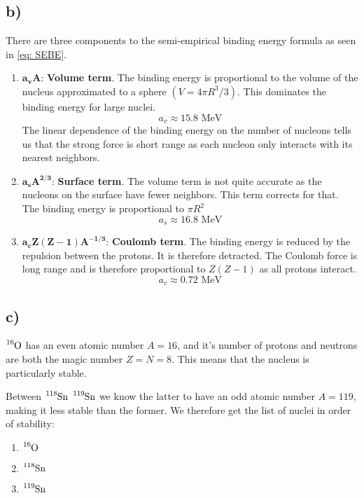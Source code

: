 \documentclass{article}
\begin{document}
\subsection*{b)}
There are three components to the semi-empirical binding energy formula as seen in \cref{eq: SEBE}. 
\begin{enumerate}
    \item $\mathbf{a_vA}$: \textbf{Volume term}. The binding energy is proportional to the volume of the nucleus approximated to a sphere $\left(V = 4πR^3/3\right)$. This dominates the binding energy for large nuclei. 
    \begin{equation}
    a_v ≈ 15.8 \text{ MeV}
    \end{equation}
    The linear dependence of the binding energy on the number of nucleons tells us that the strong force is short range as each nucleon only interacts with its nearest neighbors. 
    \item $\mathbf{a_sA^{2 / 3}}$: \textbf{Surface term}. The volume term is not quite accurate as the nucleons on the surface have fewer neighbors. This term corrects for that. The binding energy is proportional to $πR^2$
    \begin{equation}
    a_s ≈ 16.8 \text{ MeV}
    \end{equation} 
    \item $\mathbf{a_cZ(Z-1)A^{-1 / 3}}$: \textbf{Coulomb term}. The binding energy is reduced by the repulsion between the protons. It is therefore detracted. The Coulomb force is long range and is therefore proportional to $Z(Z-1)$ as all protons interact. 
    \begin{equation}
    a_c ≈ 0.72 \text{ MeV}
    \end{equation}
\end{enumerate}

\subsection*{c)}
$\ce{_{}^{16}\text{O}_{}}$ has an even atomic number $A = 16$, and it's number of protons and neutrons are both the magic number $Z = N = 8$. This means that the nucleus is particularly stable.

Between $\ce{_{}^{118}\text{Sn}_{}}$ $\ce{_{}^{119}\text{Sn}_{}}$ we know the latter to have an odd atomic number $A = 119$, making it less stable than the former. We therefore get the list of nuclei in order of stability:

\begin{enumerate}
    \item $\ce{_{}^{16}\text{O}_{}}$
    \item $\ce{_{}^{118}\text{Sn}_{}}$
    \item $\ce{_{}^{119}\text{Sn}_{}}$
\end{enumerate}
\end{document}
